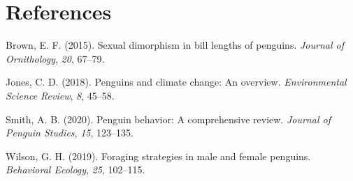 \documentclass[
  man,
  longtable,
  a4paper,
  nolmodern,
  notxfonts,
  notimes,
  colorlinks=true,linkcolor=blue,citecolor=blue,urlcolor=blue]{apa7}
\newlength{\cslhangindent}
\newenvironment{CSLReferences}[2] %
 {\begin{list}{}{%
  \setlength{\itemindent}{0pt}
  \setlength{\leftmargin}{0pt}
  \setlength{\parsep}{0pt}
  \ifodd #1
   \setlength{\leftmargin}{\cslhangindent}
   \setlength{\itemindent}{-1\cslhangindent}
  \fi
  \setlength{\itemsep}{#2\baselineskip}}}
 {\end{list}}
\begin{document}
\section{References}\label{references}

\label{refs}
\begin{CSLReferences}{1}{0}
Brown, E. F. (2015). Sexual dimorphism in bill lengths of penguins.
\emph{Journal of Ornithology}, \emph{20}, 67--79.

Jones, C. D. (2018). Penguins and climate change: An overview.
\emph{Environmental Science Review}, \emph{8}, 45--58.

Smith, A. B. (2020). Penguin behavior: A comprehensive review.
\emph{Journal of Penguin Studies}, \emph{15}, 123--135.

Wilson, G. H. (2019). Foraging strategies in male and female penguins.
\emph{Behavioral Ecology}, \emph{25}, 102--115.

\end{CSLReferences}
\end{document}
